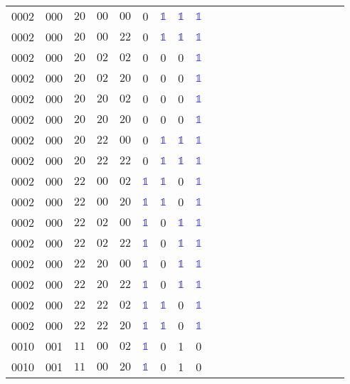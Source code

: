 \begin{longtable*}{c| cccccccccccccccccccc }
0002& 000& $20$& $00$& $00$& 0& \textcolor{blue}{$\mathds{1}$}& \textcolor{blue}{$\mathds{1}$}& \textcolor{blue}{$\mathds{1}$}\\
0002& 000& $20$& $00$& $22$& 0& \textcolor{blue}{$\mathds{1}$}& \textcolor{blue}{$\mathds{1}$}& \textcolor{blue}{$\mathds{1}$}\\
0002& 000& $20$& $02$& $02$& 0& 0& 0& \textcolor{blue}{$\mathds{1}$}\\
0002& 000& $20$& $02$& $20$& 0& 0& 0& \textcolor{blue}{$\mathds{1}$}\\
0002& 000& $20$& $20$& $02$& 0& 0& 0& \textcolor{blue}{$\mathds{1}$}\\
0002& 000& $20$& $20$& $20$& 0& 0& 0& \textcolor{blue}{$\mathds{1}$}\\
0002& 000& $20$& $22$& $00$& 0& \textcolor{blue}{$\mathds{1}$}& \textcolor{blue}{$\mathds{1}$}& \textcolor{blue}{$\mathds{1}$}\\
0002& 000& $20$& $22$& $22$& 0& \textcolor{blue}{$\mathds{1}$}& \textcolor{blue}{$\mathds{1}$}& \textcolor{blue}{$\mathds{1}$}\\
0002& 000& $22$& $00$& $02$& \textcolor{blue}{$\mathds{1}$}& \textcolor{blue}{$\mathds{1}$}& 0& \textcolor{blue}{$\mathds{1}$}\\
0002& 000& $22$& $00$& $20$& \textcolor{blue}{$\mathds{1}$}& \textcolor{blue}{$\mathds{1}$}& 0& \textcolor{blue}{$\mathds{1}$}\\
0002& 000& $22$& $02$& $00$& \textcolor{blue}{$\mathds{1}$}& 0& \textcolor{blue}{$\mathds{1}$}& \textcolor{blue}{$\mathds{1}$}\\
0002& 000& $22$& $02$& $22$& \textcolor{blue}{$\mathds{1}$}& 0& \textcolor{blue}{$\mathds{1}$}& \textcolor{blue}{$\mathds{1}$}\\
0002& 000& $22$& $20$& $00$& \textcolor{blue}{$\mathds{1}$}& 0& \textcolor{blue}{$\mathds{1}$}& \textcolor{blue}{$\mathds{1}$}\\
0002& 000& $22$& $20$& $22$& \textcolor{blue}{$\mathds{1}$}& 0& \textcolor{blue}{$\mathds{1}$}& \textcolor{blue}{$\mathds{1}$}\\
0002& 000& $22$& $22$& $02$& \textcolor{blue}{$\mathds{1}$}& \textcolor{blue}{$\mathds{1}$}& 0& \textcolor{blue}{$\mathds{1}$}\\
0002& 000& $22$& $22$& $20$& \textcolor{blue}{$\mathds{1}$}& \textcolor{blue}{$\mathds{1}$}& 0& \textcolor{blue}{$\mathds{1}$}\\
0010& 001& $11$& $00$& $02$& \textcolor{blue}{$\mathds{1}$}& 0& 1& 0\\
0010& 001& $11$& $00$& $20$& \textcolor{blue}{$\mathds{1}$}& 0& 1& 0\\

\end{longtable*}
